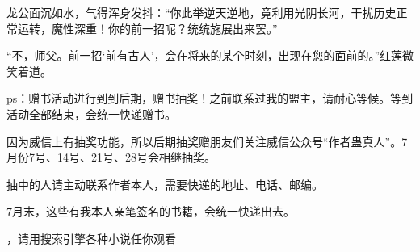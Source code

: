 \begin{this_body}
龙公面沉如水，气得浑身发抖：“你此举逆天逆地，竟利用光阴长河，干扰历史正常运转，魔性深重！你的前一招呢？统统施展出来罢。”

“不，师父。前一招‘前有古人’，会在将来的某个时刻，出现在您的面前的。”红莲微笑着道。

ps：赠书活动进行到到后期，赠书抽奖！之前联系过我的盟主，请耐心等候。等到活动全部结束，会统一快递赠书。

因为威信上有抽奖功能，所以后期抽奖赠朋友们关注威信公众号“作者蛊真人”。7月份7号、14号、21号、28号会相继抽奖。

抽中的人请主动联系作者本人，需要快递的地址、电话、邮编。

7月末，这些有我本人亲笔签名的书籍，会统一快递出去。

，请用搜索引擎各种小说任你观看

\end{this_body}

